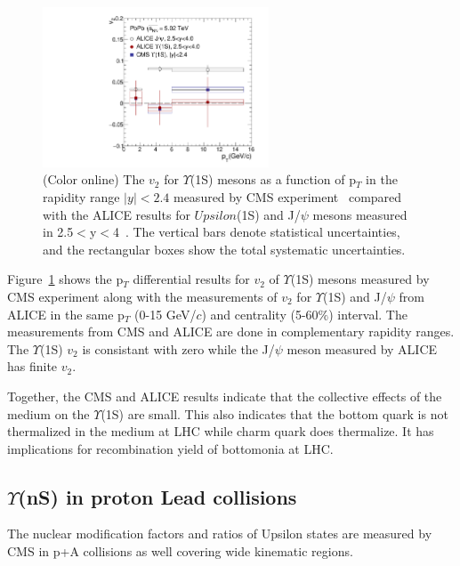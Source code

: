 \begin{figure}
  \begin{center}
\includegraphics[width=0.6\textwidth]{Figures/Fig11_CMS_ALICE_Y1S_5TeV_V2.pdf}
\caption{(Color online) The $v_{2}$ for $\Upsilon$(1S) mesons as a function of p$_{T}$ in the
  rapidity range $|y|<2.4$ measured by
  CMS experiment~\cite{CMS:2020efs} compared with the ALICE results for $Upsilon$(1S)
  and J/$\psi$ mesons measured in 2.5$<$y$<$4~\cite{ALICE:2019pox}.
  The vertical bars denote statistical uncertainties,
  and the rectangular boxes show the total systematic uncertainties.
}
\label{fig:Upsilon1SV2Compare}
\end{center}
\end{figure}

Figure~\ref{fig:Upsilon1SV2Compare} shows the p$_{T}$ differential results
for $v_{2}$ of $\Upsilon$(1S) mesons measured by CMS experiment along with the
measurements of $v_{2}$ for $\Upsilon$(1S) and J/$\psi$ from ALICE in the same
p$_{T}$ (0-15 GeV/$c$) and centrality (5-60$\%$) interval. The measurements from CMS
and ALICE are done in complementary rapidity ranges. The $\Upsilon$(1S) $v_{2}$ is
consistant with zero while the J/$\psi$ meson measured by ALICE 
has finite $v_{2}$.

Together, the CMS and ALICE
results indicate that the collective effects of the medium on the 
$\Upsilon$(1S) are small. This also indicates that the bottom quark is not
thermalized in the medium at LHC while charm quark does thermalize. It has
implications for recombination yield of bottomonia at LHC. 



\subsection{$\Upsilon$(nS) in proton Lead collisions }
\label{sectionpA}

The nuclear modification factors and ratios of Upsilon states are measured by CMS
in p+A collisions as well covering wide kinematic regions.

